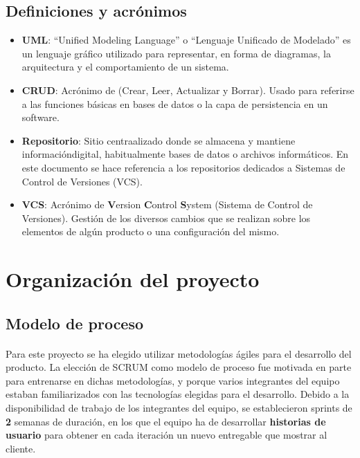 \documentclass{article}
\begin{document}
		\subsection{Definiciones y acrónimos}
			\begin{itemize}
            	\item \textbf{UML}: ``Unified Modeling Language'' o ``Lenguaje Unificado de Modelado'' es un lenguaje gráfico utilizado para representar, en forma de diagramas, la arquitectura y el comportamiento de un sistema.\cite{wikipedia:uml}
                \item \textbf{CRUD}: Acrónimo de  (Crear, Leer, Actualizar y Borrar). Usado para referirse a las funciones básicas en bases de datos o la capa de persistencia en un software.\cite{wikipedia:crud}
                \item \textbf{Repositorio}: Sitio centraalizado donde se almacena y mantiene informacióndigital, habitualmente bases de datos o archivos informáticos. En este documento se hace referencia a los repositorios dedicados a Sistemas de Control de Versiones (VCS).\cite{wikipedia:repository}
                \item \textbf{VCS}: Acrónimo de \textbf{V}ersion \textbf{C}ontrol \textbf{S}ystem (Sistema de Control de Versiones). Gestión de los diversos cambios que se realizan sobre los elementos de algún producto o una configuración del mismo.\cite{wikipedia:vcs}
			\end{itemize}

	\clearpage
    \section{Organización del proyecto}


		\subsection{Modelo de proceso}
			
            \paragraph{}
        	Para este proyecto se ha elegido utilizar metodologías ágiles para el desarrollo del producto. La elección de SCRUM como modelo de proceso fue motivada en parte para entrenarse en dichas metodologías, y porque varios integrantes del equipo estaban familiarizados con las tecnologías elegidas para el desarrollo. Debido a la disponibilidad de trabajo de los integrantes del equipo, se establecieron sprints de \textbf{2} semanas de duración, en los que el equipo ha de desarrollar \textbf{historias de usuario} para obtener en cada iteración un nuevo entregable que mostrar al cliente.
            
\end{document}
